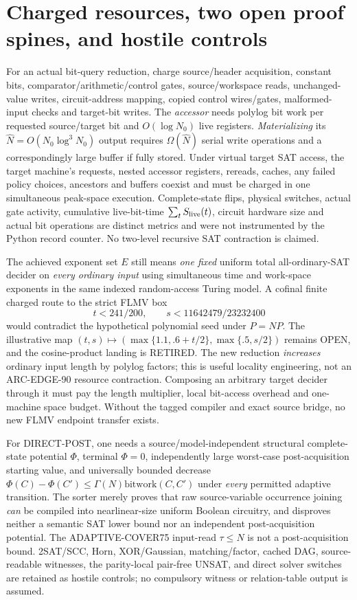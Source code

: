 \documentclass[11pt]{article}
\begin{document}
\section{Charged resources, two open proof spines, and hostile controls}
For an actual bit-query reduction, charge source/header acquisition, constant bits, comparator/arithmetic/control gates, source/workspace reads, unchanged-value writes, circuit-address mapping, copied control wires/gates, malformed-input checks and target-bit writes. The \emph{accessor} needs polylog bit work per requested source/target bit and $O(\log N_0)$ live registers. \emph{Materializing} its $\widehat N=O(N_0\log^3N_0)$ output requires $\Omega(\widehat N)$ serial write operations and a correspondingly large buffer if fully stored. Under virtual target SAT access, the target machine's requests, nested accessor registers, rereads, caches, any failed policy choices, ancestors and buffers coexist and must be charged in one simultaneous peak-space execution. Complete-state flips, physical switches, actual gate activity, cumulative live-bit-time $\sum_t S_{\rm live}(t)$, circuit hardware size and actual bit operations are distinct metrics and were not instrumented by the Python record counter. No two-level recursive SAT contraction is claimed.

The achieved exponent set $E$ still means \emph{one fixed} uniform total all-ordinary-SAT decider on \emph{every ordinary input} using simultaneous time and work-space exponents in the same indexed random-access Turing model. A cofinal finite charged route to the strict FLMV box
\[
t<241/200,\qquad s<11642479/23232400
\]
would contradict the hypothetical polynomial seed under $P=NP$. The illustrative map $(t,s)\mapsto(\max\{1.1,.6+t/2\},\max\{.5,s/2\})$ remains OPEN, and the cosine-product landing is RETIRED. The new reduction \emph{increases} ordinary input length by polylog factors; this is useful locality engineering, not an ARC-EDGE-90 resource contraction. Composing an arbitrary target decider through it must pay the length multiplier, local bit-access overhead and one-machine space budget. Without the tagged compiler and exact source bridge, no new FLMV endpoint transfer exists.

For DIRECT-POST, one needs a source/model-independent structural complete-state potential $\Phi$, terminal $\Phi=0$, independently large worst-case post-acquisition starting value, and universally bounded decrease $\Phi(C)-\Phi(C')\le\Gamma(N)\mathrm{bitwork}(C,C')$ under \emph{every} permitted adaptive transition. The sorter merely proves that raw source-variable occurrence joining \emph{can} be compiled into nearlinear-size uniform Boolean circuitry, and disproves neither a semantic SAT lower bound nor an independent post-acquisition potential. The ADAPTIVE-COVER75 input-read $\tau\le N$ is not a post-acquisition bound. 2SAT/SCC, Horn, XOR/Gaussian, matching/factor, cached DAG, source-readable witnesses, the parity-local pair-free UNSAT, and direct solver switches are retained as hostile controls; no compulsory witness or relation-table output is assumed.
\end{document}
